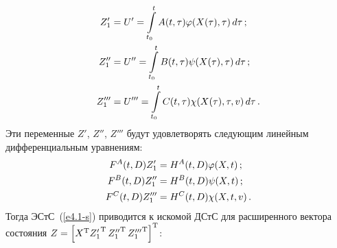 \begin{multicols}{2}
\begin{align*}
Z_1' &= U' =\int\limits_{t_0}^t A(t,\tau) \varphi(X(\tau), \tau)\,d\tau\,;\\
Z_1''&= U'' =\int\limits_{t_0}^t B(t,\tau) \psi(X(\tau), \tau)\,d\tau\,;\\
Z_1'''&= U''' =\int\limits_{t_0}^t C(t,\tau) \chi(X(\tau), \tau,v)\,d\tau\,.
    \end{align*}
Эти переменные  $Z'$, $Z''$, $Z'''$ будут удовлетворять следующим линейным
дифференциальным уравнениям:
\begin{align*}
F^A(t, D) Z_1' &= H^A (t, D) \varphi (X, t)\,;\\
    F^B(t, D) Z_1'' &= H^B (t, D) \psi (X, t)\,;\\
F^C(t, D) Z_1''' &= H^C (t, D) \chi (X, t,v)\,.
 \end{align*}
Тогда ЭСтС~(\ref{e4.1-s}) приводится к искомой ДСтС для расширенного вектора
состояния $Z\hm= \lk X^{\mathrm{T}} {Z_1'}^{\mathrm{T}}\, {Z_1''}^{\mathrm{T}}\,{Z_1'''}^{\mathrm{T}}\rk^{\mathrm{T}}$:


\end{multicols}

